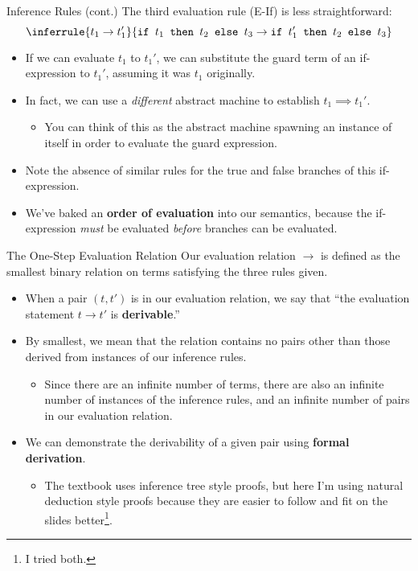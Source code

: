 \documentclass[11pt]{beamer}
\begin{document}
\begin{frame}[fragile=singleslide]{Inference Rules (cont.)}
The third evaluation rule (E-If) is less straightforward:
\begin{equation}
\inferrule{t_1 \rightarrow t_1'}{\texttt{if } t_1 \texttt{ then } t_2 \texttt{ else } t_3 \rightarrow \texttt{if } t_1' \texttt{ then } t_2 \texttt{ else } t_3}
\end{equation}
\begin{itemize}
\item If we can evaluate $t_1$ to $t_1'$, we can substitute the guard term of an if-expression to $t_1'$, assuming it was $t_1$ originally.  
\item In fact, we can use a \emph{different} abstract machine to establish $t_1 \implies t_1'$.
\begin{itemize}
\item You can think of this as the abstract machine spawning an instance of itself in order to evaluate the guard expression.  
\end{itemize}
\item Note the absence of similar rules for the true and false branches of this if-expression.  
\item We've baked an \textbf{order of evaluation} into our semantics, because the if-expression \emph{must} be evaluated \emph{before} branches can be evaluated.  
\end{itemize}
\end{frame}

\begin{frame}[fragile=singleslide]{The One-Step Evaluation Relation}
Our evaluation relation $\rightarrow$ is defined as the smallest binary relation on terms satisfying the three rules given.  
\begin{itemize}
\item When a pair $(t,t')$ is in our evaluation relation, we say that ``the evaluation statement $t \rightarrow t'$ is \textbf{derivable}.'' 
\item By smallest, we mean that the relation contains no pairs other than those derived from instances of our inference rules.  
\begin{itemize}
\item Since there are an infinite number of terms, there are also an infinite number of instances of the inference rules, and an infinite number of pairs in our evaluation relation.  
\end{itemize}
\item We can demonstrate the derivability of a given pair using \textbf{formal derivation}.
\begin{itemize}
\item The textbook uses inference tree style proofs, but here I'm using natural deduction style proofs because they are easier to follow and fit on the slides better\footnote{I tried both.}.
\end{itemize}
\end{itemize}
\end{frame}
\end{document}
